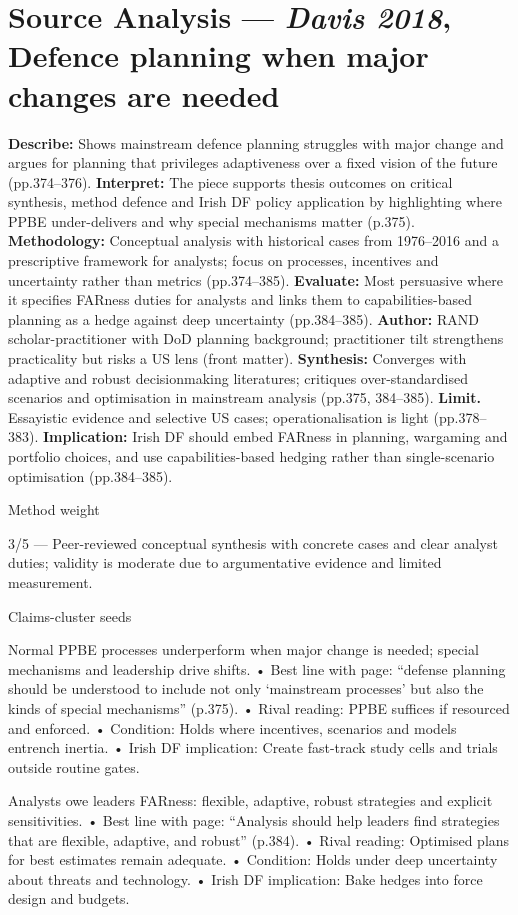 \section*{Source Analysis — \textit{Davis 2018}, Defence planning when major changes are needed}
\textbf{Describe:} Shows mainstream defence planning struggles with major change and argues for planning that privileges adaptiveness over a fixed vision of the future (pp.374–376).
\textbf{Interpret:} The piece supports thesis outcomes on critical synthesis, method defence and Irish DF policy application by highlighting where PPBE under-delivers and why special mechanisms matter (p.375).
\textbf{Methodology:} Conceptual analysis with historical cases from 1976–2016 and a prescriptive framework for analysts; focus on processes, incentives and uncertainty rather than metrics (pp.374–385).
\textbf{Evaluate:} Most persuasive where it specifies FARness duties for analysts and links them to capabilities-based planning as a hedge against deep uncertainty (pp.384–385).
\textbf{Author:} RAND scholar-practitioner with DoD planning background; practitioner tilt strengthens practicality but risks a US lens (front matter).
\textbf{Synthesis:} Converges with adaptive and robust decisionmaking literatures; critiques over-standardised scenarios and optimisation in mainstream analysis (pp.375, 384–385).
\textbf{Limit.} Essayistic evidence and selective US cases; operationalisation is light (pp.378–383).
\textbf{Implication:} Irish DF should embed FARness in planning, wargaming and portfolio choices, and use capabilities-based hedging rather than single-scenario optimisation (pp.384–385).

Method weight

3/5 — Peer-reviewed conceptual synthesis with concrete cases and clear analyst duties; validity is moderate due to argumentative evidence and limited measurement.

Claims-cluster seeds

Normal PPBE processes underperform when major change is needed; special mechanisms and leadership drive shifts.
• Best line with page: “defense planning should be understood to include not only ‘mainstream processes’ but also the kinds of special mechanisms” (p.375).
• Rival reading: PPBE suffices if resourced and enforced.
• Condition: Holds where incentives, scenarios and models entrench inertia.
• Irish DF implication: Create fast-track study cells and trials outside routine gates.

Analysts owe leaders FARness: flexible, adaptive, robust strategies and explicit sensitivities.
• Best line with page: “Analysis should help leaders find strategies that are flexible, adaptive, and robust” (p.384).
• Rival reading: Optimised plans for best estimates remain adequate.
• Condition: Holds under deep uncertainty about threats and technology.
• Irish DF implication: Bake hedges into force design and budgets.

